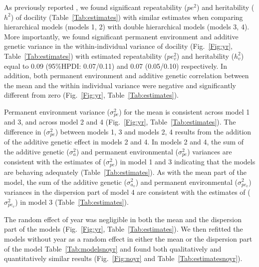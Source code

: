 \documentclass[a4paper,12pt,twoside]{article}
\begin{document}
	As previously reported \citep{petelle_heritability_2015}, we found significant repeatability ($pe^2$) and heritability ($h^2$) of docility (Table~\ref{Tab:estimates}) with similar estimates when comparing hierarchical models (models 1, 2) with double hierarchical models (models 3, 4).
	More importantly, we found significant permanent environment and additive genetic variance in the within-individual variance of docility (Fig.~\ref{Fig:yr}, Table~\ref{Tab:estimates}) with estimated repeatability ($pe_v^2$) and heritability ($h_v^2$) equal to 0.09 (95\%HPDI: 0.07/0.11) and 0.07 (0.05/0.10) respectively.
	In addition, both permanent environment and additive genetic correlation between the mean and the within individual variance were negative and significantly different from zero (Fig.~\ref{Fig:yr}, Table~\ref{Tab:estimates}).
	
	Permanent environment variance ($\sigma_{pe}^2$) for the mean is consistent across model 1 and 3, and across model 2 and 4 (Fig.~\ref{Fig:yr}, Table~\ref{Tab:estimates}).
	The difference in ($\sigma_{pe}^2$) between models 1, 3 and models 2, 4 results from the addition of the additive genetic effect in models 2 and 4.
	In models 2 and 4, the sum of the additive genetic ($\sigma_{a}^2$) and permanent environmental ($\sigma_{pe}^2$) variances are consistent with the estimates of ($\sigma_{pe}^2$) in model 1 and 3 indicating that the models are behaving adequately (Table~\ref{Tab:estimates}).
	As with the mean part of the model, the sum of the additive genetic ($\sigma_{a_v}^2$) and permanent environmental ($\sigma_{pe_v}^2$) variances in the dispersion part of model 4 are consistent with the estimates of ($\sigma_{pe_v}^2$) in model 3 (Table~\ref{Tab:estimates}).
	
	The random effect of year was negligible in both the mean and the dispersion part of the models (Fig.~\ref{Fig:yr}, Table~\ref{Tab:estimates}).
	We then refitted the models without year as a random effect in either the mean or the dispersion part of the model Table~\ref{Tab:modelsnoyr} and found both qualitatively and quantitatively similar results (Fig.~\ref{Fig:noyr} and Table~\ref{Tab:estimatesnoyr}).
	
\end{document}

